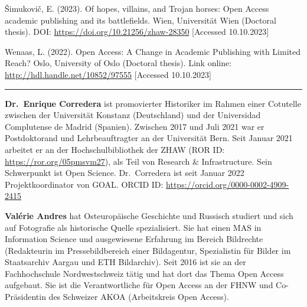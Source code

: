 \documentclass[a4paper,
fontsize=11pt,
oneside,
numbers=noperiodatend,
parskip=half-,
bibliography=totoc,
final
]{scrartcl}
\begin{document}
Šimukovič, E. (2023). Of hopes, villains, and Trojan horses: Open Access
academic publishing and its battlefields. Wien, Universität Wien
(Doctoral thesis). DOI: \url{https://doi.org/10.21256/zhaw-28350}
{[}Accessed 10.10.2023{]}

Wenaas, L. (2022). Open Access: A Change in Academic Publishing with
Limited Reach? Oslo, University of Oslo (Doctoral thesis). Link online:
\url{http://hdl.handle.net/10852/97555} {[}Accessed 10.10.2023{]}

\begin{center}\rule{0.5\linewidth}{0.5pt}\end{center}

\textbf{Dr.~Enrique Corredera} ist promovierter Historiker im Rahmen
einer Cotutelle zwischen der Universität Konstanz (Deutschland) und der
Universidad Complutense de Madrid (Spanien). Zwischen 2017 und Juli 2021
war er Postdoktorand und Lehrbeauftragter an der Universität Bern. Seit
Januar 2021 arbeitet er an der Hochschulbibliothek der ZHAW (ROR ID:
\url{https://ror.org/05pmsvm27}), als Teil von Research \&
Infrastructure. Sein Schwerpunkt ist Open Science. Dr.~Corredera ist
seit Januar 2022 Projektkoordinator von GOAL. ORCID ID:
\url{https://orcid.org/0000-0002-4909-2415}

\textbf{Valérie Andres} hat Osteuropäische Geschichte und Russisch
studiert und sich auf Fotografie als historische Quelle spezialisiert.
Sie hat einen MAS in Information Science und ausgewiesene Erfahrung im
Bereich Bildrechte (Redakteurin im Pressebildbereich einer Bildagentur,
Spezialistin für Bilder im Staatsarchiv Aargau und ETH Bildarchiv). Seit
2016 ist sie an der Fachhochschule Nordwestschweiz tätig und hat dort
das Thema Open Access aufgebaut. Sie ist die Verantwortliche für Open
Access an der FHNW und Co-Präsidentin des Schweizer AKOA (Arbeitskreis
Open Access).
\end{document}
